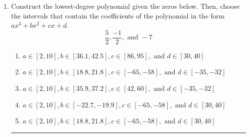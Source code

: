 \documentclass[14pt]{extbook}
\newcommand{\litem}[1]{\item#1\hspace*{-1cm}\rule{\textwidth}{0.4pt}}
\begin{document}
\begin{enumerate}
{\begin{enumerate}[label=\Alph*.]
\end{enumerate} }
\litem{
Construct the lowest-degree polynomial given the zeros below. Then, choose the intervals that contain the coefficients of the polynomial in the form $ax^3+bx^2+cx+d$.\[ \frac{5}{2}, \frac{-1}{2}, \text{ and } -7 \]\begin{enumerate}[label=\Alph*.]
\item \( a \in [2, 10], b \in [36.1, 42.5], c \in [86, 95], \text{ and } d \in [30, 40] \)
\item \( a \in [2, 10], b \in [18.8, 21.8], c \in [-65, -58], \text{ and } d \in [-35, -32] \)
\item \( a \in [2, 10], b \in [35.9, 37.2], c \in [42, 60], \text{ and } d \in [-35, -32] \)
\item \( a \in [2, 10], b \in [-22.7, -19.9], c \in [-65, -58], \text{ and } d \in [30, 40] \)
\item \( a \in [2, 10], b \in [18.8, 21.8], c \in [-65, -58], \text{ and } d \in [30, 40] \)


\end{enumerate}}
\end{enumerate}
\end{document}
